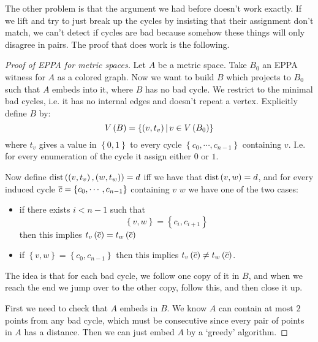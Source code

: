 \documentclass{amsart}
\begin{document}
The other problem is that the argument we had before doesn't work exactly. If we lift and
try to just break up the cycles by insisting that their assignment don't match, we
can't detect if cycles are bad because somehow these things will only disagree in pairs.
The proof that does work is the following.

\begin{proof}[Proof of EPPA for metric spaces]
Let $A$ be a metric space. Take $B_0$ an EPPA witness for $A$ as a colored graph. Now we
want to build $B$ which projects to $B_0$ such that $A$ embeds into it, where $B$ has no
bad cycle. We restrict to the minimal bad cycles, i.e. it has no internal edges and
doesn't repeat a vertex. Explicitly define $B$ by:
\begin{equation}
V\left( B \right) = \left\{ \left( v , t_v \right) \, \middle\vert \, v\in V\left( B_0 \right)\right\}
\end{equation}
where $t_v$ gives a value in $\left\{ 0,1 \right\}$ to every cycle $\left\{ c_0 , \cdots ,
c_{n-1}\right\}$ containing $v$.
I.e. for every enumeration of the cycle it assign either $0$ or $1$.

Now define $\operatorname{dist}\left( \left( v , t_v \right) , \left( w , t_w \right) \right) = d$
iff we have that $\operatorname{dist}\left( v,w \right) = d$, and
for every induced cycle $\overline{c} = \left\{ c_0 ,\cdots , c_{n-1}\right\}$ containing $v$ $w$ 
we have one of the two cases:
\begin{itemize}
\item if there exists $i < n-1$ such that
\begin{equation}
\left\{ v,w \right\} = \left\{ c_i , c_{i+1} \right\}
\end{equation}
then this implies $t_v\left( \overline{c} \right) = t_w\left( \overline{c} \right)$
\item if $\left\{ v,w \right\} = \left\{ c_0 , c_{n-1} \right\}$ 
then this implies $t_v\left( \overline{c} \right)\neq t_w\left(\overline{c} \right)$.
\end{itemize}
The idea is that for each bad cycle, we follow one copy of it in $B$, 
and when we reach the end we jump over to the other copy, follow this, and then close it up.

First we need to check that $A$ embeds in $B$. 
We know $A$ can contain at most $2$ points from any bad cycle, which must be consecutive since
every pair of points in $A$ has a distance. Then we can just embed $A$ by a `greedy' 
algorithm.


\end{proof}
\end{document}
